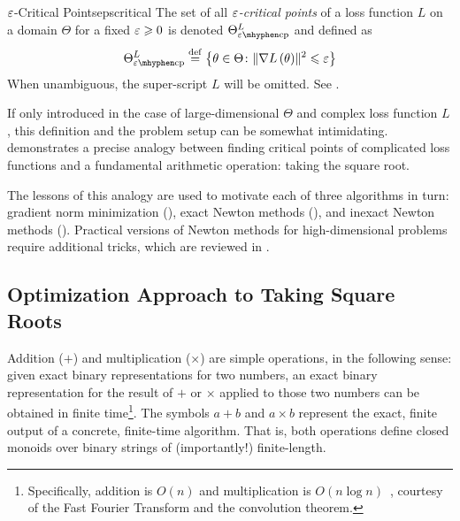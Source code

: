 \documentclass[../../thesis.tex]{subfiles}
\begin{document}
\begin{definition}{$\varepsilon$-Critical Points}{epscritical}
	The set of all \emph{$\varepsilon$-critical points} of a loss function $L$
	on a domain $\Theta$ for a fixed $\varepsilon\geqslant0$ is denoted $\Theta^L_{\ecp}$
	and defined as
	\begin{equation}\equationlabel{def-epscp}
		\Theta^L_{\ecp} \defeq
		\Set{\theta \in \Theta \suchthat \sgn{L}{\theta} \leq \eps}
	\end{equation}
	When unambiguous, the super-script $L$ will be omitted.
	See .
\end{definition}

If only introduced in the case of large-dimensional $\Theta$
and complex loss function $L$,
this definition and the problem setup can be somewhat intimidating.
 demonstrates a precise analogy
between finding critical points of complicated loss functions
and a fundamental arithmetic operation: taking the square root.

The lessons of this analogy are used to motivate
each of three algorithms in turn:
gradient norm minimization (),
exact Newton methods (),
and inexact Newton methods ().
Practical versions of Newton methods
for high-dimensional problems
require additional tricks,
which are reviewed in .

\subsection{Optimization Approach to Taking Square Roots}

Addition ($+$) and multiplication ($\times$)
are simple operations, in the following sense:
given exact binary representations for two numbers,
an exact binary representation for the result of $+$ or $\times$
applied to those two numbers can be obtained in finite time\footnote{%
Specifically, addition is $O(n)$ and
multiplication is $O(n\log n)$~\cite{harvey2019},
courtesy of the Fast Fourier Transform and the convolution theorem.}.
The symbols $a + b$ and $a \times b$ represent the exact, finite output
of a concrete, finite-time algorithm.
That is, both operations define closed monoids over
binary strings of
(importantly!) finite-length.
\end{document}
